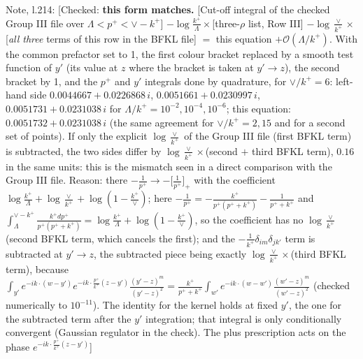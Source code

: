\documentclass[10pt]{article}
\newenvironment{notebox}{\def\FrameCommand{{\color{notebar}\vrule width 1.5pt}\hspace{6pt}}\MakeFramed{\advance\hsize-\width\FrameRestore}\small}{\endMakeFramed}
\begin{document}
\begin{notebox}\textsf{\small Note, l.214:} [Checked: \textbf{this form matches.} [Cut-off integral of the checked Group III file over $\Lambda<p^{+}<\vee-k^{+}$] $-\log\frac{k^{+}}{\Lambda}\times$[three-$\rho$ list, Row III] $-\log\frac{\vee}{k^{+}}\times$[\emph{all three} terms of this row in the BFKL file] $=$ this equation $+\mathcal{O}(\Lambda/k^{+})$. With the common prefactor set to 1, the first colour bracket replaced by a smooth test function of $y'$ (its value at $z$ where the bracket is taken at $y'\to z$), the second bracket by 1, and the $p^{+}$ and $y'$ integrals done by quadrature, for $\vee/k^{+}=6$: left-hand side $0.0044667+0.0226868\,i$, $0.0051661+0.0230997\,i$, $0.0051731+0.0231038\,i$ for $\Lambda/k^{+}=10^{-2},10^{-4},10^{-6}$; this equation: $0.0051732+0.0231038\,i$ (the same agreement for $\vee/k^{+}=2,15$ and for a second set of points). If only the explicit $\log\frac{\vee}{k^{+}}$ of the Group III file (first BFKL term) is subtracted, the two sides differ by $\log\frac{\vee}{k^{+}}\times$(second $+$ third BFKL term), $0.16$ in the same units: this is the mismatch seen in a direct comparison with the Group III file. Reason: there $-\frac{1}{p^{+}}\to-\big[\frac{1}{p^{+}}\big]_{+}$ with the coefficient $\log\frac{k^{+}}{\Lambda}+\log\frac{\vee}{k^{+}}+\log(1-\frac{k^{+}}{\vee})$; here $-\frac{1}{p^{+}}=-\frac{k^{+}}{p^{+}(p^{+}+k^{+})}-\frac{1}{p^{+}+k^{+}}$ and $\int_{\Lambda}^{\vee-k^{+}}\frac{k^{+}dp^{+}}{p^{+}(p^{+}+k^{+})}=\log\frac{k^{+}}{\Lambda}+\log(1-\frac{k^{+}}{\vee})$, so the coefficient has no $\log\frac{\vee}{k^{+}}$ (second BFKL term, which cancels the first); and the $-\frac{1}{k^{+}}\delta_{im}\delta_{jk'}$ term is subtracted at $y'\to z$, the subtracted piece being exactly $\log\frac{\vee}{k^{+}}\times$(third BFKL term), because $\int_{y'}e^{-ik\cdot(w-y')}e^{-ik\cdot\frac{p^{+}}{k^{+}}(z-y')}\frac{(y'-z)^{m}}{(y'-z)^{2}}=\frac{k^{+}}{p^{+}+k^{+}}\int_{w'}e^{-ik\cdot(w-w')}\frac{(w'-z)^{m}}{(w'-z)^{2}}$ (checked numerically to $10^{-11}$). The identity for the kernel holds at fixed $y'$, the one for the subtracted term after the $y'$ integration; that integral is only conditionally convergent (Gaussian regulator in the check). The plus prescription acts on the phase $e^{-ik\cdot\frac{p^{+}}{k^{+}}(z-y')}$]\end{notebox}
\par
{}\par
\end{document}
